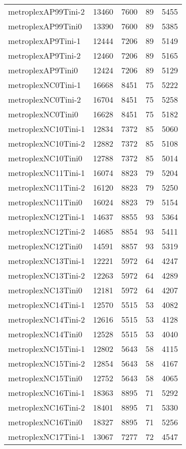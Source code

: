 \begin{longtable}{lrrrr}
metroplexAP99Tini-2 & 13460 & 7600 & 89 & 5455 \\
metroplexAP99Tini0 & 13390 & 7600 & 89 & 5385 \\
metroplexAP9Tini-1 & 12444 & 7206 & 89 & 5149 \\
metroplexAP9Tini-2 & 12460 & 7206 & 89 & 5165 \\
metroplexAP9Tini0 & 12424 & 7206 & 89 & 5129 \\
metroplexNC0Tini-1 & 16668 & 8451 & 75 & 5222 \\
metroplexNC0Tini-2 & 16704 & 8451 & 75 & 5258 \\
metroplexNC0Tini0 & 16628 & 8451 & 75 & 5182 \\
metroplexNC10Tini-1 & 12834 & 7372 & 85 & 5060 \\
metroplexNC10Tini-2 & 12882 & 7372 & 85 & 5108 \\
metroplexNC10Tini0 & 12788 & 7372 & 85 & 5014 \\
metroplexNC11Tini-1 & 16074 & 8823 & 79 & 5204 \\
metroplexNC11Tini-2 & 16120 & 8823 & 79 & 5250 \\
metroplexNC11Tini0 & 16024 & 8823 & 79 & 5154 \\
metroplexNC12Tini-1 & 14637 & 8855 & 93 & 5364 \\
metroplexNC12Tini-2 & 14685 & 8854 & 93 & 5411 \\
metroplexNC12Tini0 & 14591 & 8857 & 93 & 5319 \\
metroplexNC13Tini-1 & 12221 & 5972 & 64 & 4247 \\
metroplexNC13Tini-2 & 12263 & 5972 & 64 & 4289 \\
metroplexNC13Tini0 & 12181 & 5972 & 64 & 4207 \\
metroplexNC14Tini-1 & 12570 & 5515 & 53 & 4082 \\
metroplexNC14Tini-2 & 12616 & 5515 & 53 & 4128 \\
metroplexNC14Tini0 & 12528 & 5515 & 53 & 4040 \\
metroplexNC15Tini-1 & 12802 & 5643 & 58 & 4115 \\
metroplexNC15Tini-2 & 12854 & 5643 & 58 & 4167 \\
metroplexNC15Tini0 & 12752 & 5643 & 58 & 4065 \\
metroplexNC16Tini-1 & 18363 & 8895 & 71 & 5292 \\
metroplexNC16Tini-2 & 18401 & 8895 & 71 & 5330 \\
metroplexNC16Tini0 & 18327 & 8895 & 71 & 5256 \\
metroplexNC17Tini-1 & 13067 & 7277 & 72 & 4547 \\

\end{longtable}
